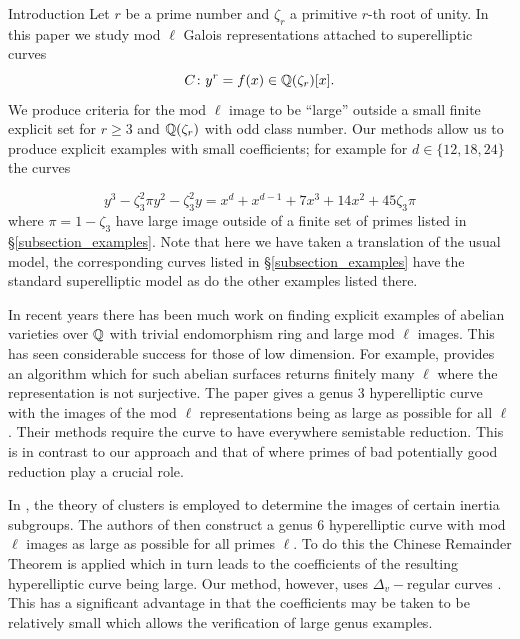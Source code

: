 \documentclass[11pt,a4paper]{article}
\newcommand{\Dv}{\Delta_v}
\newcommand{\Qr}{{\QQ(\zeta_r)}}
\newcommand{\zr}{\zeta_r}
\begin{document}
\tableofcontents
\newpage
\begin{section}{Introduction}
\label{section_introduction}
Let $r$ be a prime number and $\zr$ a primitive $r$-th root of unity. In this paper we study  mod $\ell$ Galois representations attached to superelliptic curves 
\[C\colon y^r = f(x) \in \Qr[x].\]
We produce criteria for the mod $\ell$ image to be ``large'' outside a small finite explicit set for $r\geq 3$ and $\Qr$ with odd class number.
Our methods allow us to produce explicit examples with small coefficients; for example for $d \in \{12,18,24\}$ the curves

\begin{equation} \label{eq:introduction_examples}
y^3 - \zeta_3^2 \pi y^2 - \zeta_3^2 y= x^{d} + x^{d-1} + 7x^3 + 14 x^2 + 45\zeta_3\pi
\end{equation}
where $\pi = 1- \zeta_3$ have large image outside of a finite set of primes listed in  \S \ref{subsection_examples}. Note that here we have taken a translation of the usual model, the corresponding curves listed in \S \ref{subsection_examples} have the standard superelliptic model as do the other examples listed there.

In recent years there has been much work on finding explicit examples of abelian varieties over $\mathbb{Q}$ with trivial endomorphism ring and large mod $\ell$ images.
This has seen considerable success for those of low dimension.
For example, \cite{Dieulefait_genus2} provides an algorithm which for such abelian surfaces returns finitely many $\ell$ where the representation is not surjective.
The paper \cite{Anni_Lemos_Siksek} gives a genus 3 hyperelliptic curve with the images of the mod $\ell$ representations being as large as possible for all $\ell$.
Their methods require the curve to have everywhere semistable reduction.
This is in contrast to our approach and that of \cite{Anni_VDok} where primes of bad potentially good reduction play a crucial role.

In \cite{Anni_VDok}, the theory of clusters \cite{M2D2} is employed to determine the images of certain inertia subgroups.
The authors of \cite{Anni_VDok} then construct a genus 6 hyperelliptic curve with mod $\ell$ images as large as possible for all primes $\ell$.
To do this the Chinese Remainder Theorem is applied which in turn leads to the coefficients of the resulting hyperelliptic curve being large.
Our method, however, uses $\Dv-$regular curves \cite{Models_Curves_DVR}. This has a significant advantage in that the coefficients may be taken to be relatively small which allows the verification of large genus examples.


\end{section}
\end{document}
